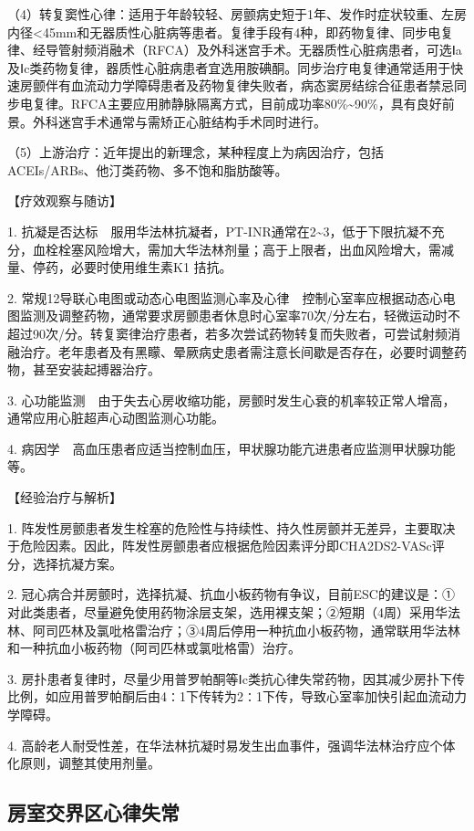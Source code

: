 （4）转复窦性心律：适用于年龄较轻、房颤病史短于1年、发作时症状较重、左房内径\textless{}45mm和无器质性心脏病等患者。复律手段有4种，即药物复律、同步电复律、经导管射频消融术（RFCA）及外科迷宫手术。无器质性心脏病患者，可选Ⅰa及Ⅰc类药物复律，器质性心脏病患者宜选用胺碘酮。同步治疗电复律通常适用于快速房颤伴有血流动力学障碍患者及药物复律失败者，病态窦房结综合征患者禁忌同步电复律。RFCA主要应用肺静脉隔离方式，目前成功率80\%\textasciitilde{}90\%，具有良好前景。外科迷宫手术通常与需矫正心脏结构手术同时进行。

（5）上游治疗：近年提出的新理念，某种程度上为病因治疗，包括ACEIs/ARBs、他汀类药物、多不饱和脂肪酸等。

【疗效观察与随访】

1.
抗凝是否达标　服用华法林抗凝者，PT-INR通常在2\textasciitilde{}3，低于下限抗凝不充分，血栓栓塞风险增大，需加大华法林剂量；高于上限者，出血风险增大，需减量、停药，必要时使用维生素K{1}
拮抗。

2.
常规12导联心电图或动态心电图监测心率及心律　控制心室率应根据动态心电图监测及调整药物，通常要求房颤患者休息时心室率70次/分左右，轻微运动时不超过90次/分。转复窦律治疗患者，若多次尝试药物转复而失败者，可尝试射频消融治疗。老年患者及有黑矇、晕厥病史患者需注意长间歇是否存在，必要时调整药物，甚至安装起搏器治疗。

3.
心功能监测　由于失去心房收缩功能，房颤时发生心衰的机率较正常人增高，通常应用心脏超声心动图监测心功能。

4.
病因学　高血压患者应适当控制血压，甲状腺功能亢进患者应监测甲状腺功能等。

【经验治疗与解析】

1.
阵发性房颤患者发生栓塞的危险性与持续性、持久性房颤并无差异，主要取决于危险因素。因此，阵发性房颤患者应根据危险因素评分即CHA2DS2-VASc评分，选择抗凝方案。

2.
冠心病合并房颤时，选择抗凝、抗血小板药物有争议，目前ESC的建议是：①对此类患者，尽量避免使用药物涂层支架，选用裸支架；②短期（4周）采用华法林、阿司匹林及氯吡格雷治疗；③4周后停用一种抗血小板药物，通常联用华法林和一种抗血小板药物（阿司匹林或氯吡格雷）治疗。

3.
房扑患者复律时，尽量少用普罗帕酮等Ⅰc类抗心律失常药物，因其减少房扑下传比例，如应用普罗帕酮后由4∶1下传转为2∶1下传，导致心室率加快引起血流动力学障碍。

4.
高龄老人耐受性差，在华法林抗凝时易发生出血事件，强调华法林治疗应个体化原则，调整其使用剂量。

\subsection{房室交界区心律失常}

